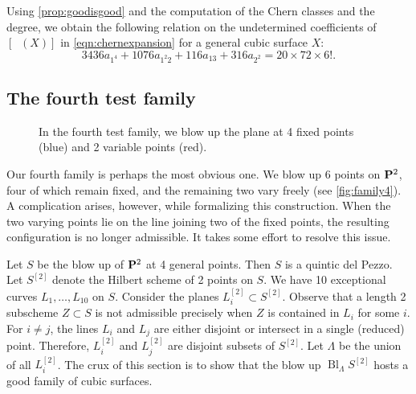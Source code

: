 \documentclass[11pt,reqno, letterpaper]{amsart}
\DeclareMathOperator{\Bl}{Bl}
\DeclareMathOperator{\Orb}{\overline{Orb}}
\numberwithin{equation}{section}
\begin{document}
Using \autoref{prop:goodisgood} and the computation of the Chern classes and the degree, we obtain the following relation on the undetermined coefficients of $[\Orb(X)]$ in
\eqref{eqn:chernexpansion} for a general cubic surface $X$:
\begin{equation}
  \label{eq:relation3}
  3436a_{1^4} + 1076a_{1^{2}2} + 116 a_{13} + 316 a_{2^{2}} = 20 \times 72 \times 6!.
\end{equation}



\subsection{The fourth test family}
\label{sec:family-b_4}
\begin{figure}
    \centering
    
    \caption{In the fourth test family, we blow up the plane at 4 fixed points (blue) and 2 variable points (red).}
    \label{fig:family4}
  \end{figure}
Our fourth family is perhaps the most obvious one.
We blow up 6 points on $\P^2$, four of which remain fixed, and the remaining two vary freely (see \autoref{fig:family4}).
A complication arises, however, while formalizing this construction.
When the two varying points lie on the line joining two of the fixed points, the resulting configuration is no longer admissible.
It takes some effort to resolve this issue.

Let $S$ be the blow up of $\P^2$ at 4 general points.
Then $S$ is a quintic del Pezzo. 
Let $S^{[2]}$ denote the Hilbert scheme of 2 points on $S$.
We have 10 exceptional curves $L_1, \dots, L_{10}$ on $S$.
Consider the planes $L^{[2]}_i \subset S^{[2]}$.
Observe that a length 2 subscheme $Z \subset S$ is not admissible precisely when $Z$ is contained in $L_i$ for some $i$.
For $i \neq j$, the lines $L_i$ and $L_j$ are either disjoint or intersect in a single (reduced) point.
Therefore, $L^{[2]}_i$ and  $L^{[2]}_j$ are disjoint subsets of $S^{[2]}$.
Let $\Lambda$ be the union of all $L^{[2]}_i$.
The crux of this
section is to show that the blow up $\Bl_{\Lambda}S^{[2]}$ hosts a
good family of cubic surfaces.
\end{document}
